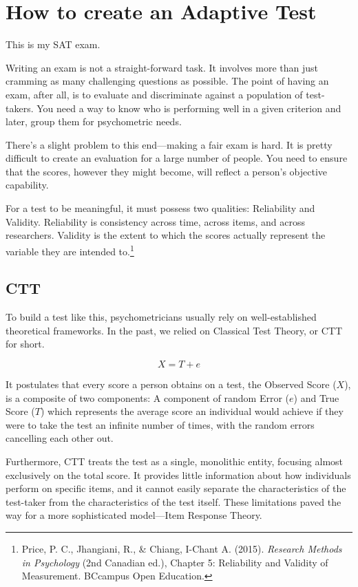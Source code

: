 \documentclass{article}
\begin{document}
\section*{How to create an Adaptive Test}

This is my SAT exam.

Writing an exam is not a straight-forward task. It involves more than just cramming as many challenging questions as possible. The point of having an exam, after all, is to evaluate and discriminate against a population of test-takers. You need a way to know who is performing well in a given criterion and later, group them for psychometric needs.

There's a slight problem to this end—making a fair exam is hard. It is pretty difficult to create an evaluation for a large number of people. You need to ensure that the scores, however they might become, will reflect a person's objective capability.

For a test to be meaningful, it must possess two qualities: Reliability and 
Validity. Reliability is consistency across time, across items, and across 
researchers. Validity is the extent to which the scores actually represent 
the variable they are intended to.\footnote{Price, P. C., Jhangiani, R., \& Chiang, I-Chant A. (2015). \textit{Research Methods in Psychology} (2nd Canadian ed.), Chapter 5: Reliability and Validity of Measurement. BCcampus Open Education.}

\subsection*{CTT}

To build a test like this, psychometricians usually rely on well-established theoretical frameworks. In the past, we relied on Classical Test Theory, or CTT for short.

\[
X = T + e
\]

It postulates that every score a person obtains on a test, the Observed Score ($X$), is a composite of two components: A component of random Error ($e$) and True Score ($T$) which represents the average score an individual would achieve if they were to take the test an infinite number of times, with the random errors cancelling each other out.

Furthermore, CTT treats the test as a single, monolithic entity, focusing almost exclusively on the total score. It provides little information about how individuals perform on specific items, and it cannot easily separate the characteristics of the test-taker from the characteristics of the test itself. These limitations paved the way for a more sophisticated model—Item Response Theory.
\end{document}
